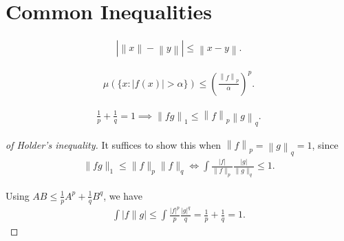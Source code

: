 \hypertarget{common-inequalities}{%
\section{Common Inequalities}\label{common-inequalities}}

\begin{proposition}

\begin{align*}  
{\left\lvert {{\left\lVert {x} \right\rVert} - {\left\lVert {y} \right\rVert}} \right\rvert} \leq {\left\lVert {x - y} \right\rVert}
.\end{align*}

\end{proposition}

\begin{proposition}

\begin{align*}  
\mu(\{x:|f(x)|>\alpha\}) \leq\left(\frac{{\left\lVert {f} \right\rVert}_{p}}{\alpha}\right)^{p}
.\end{align*}

\end{proposition}

\begin{proposition}

\begin{align*}  
\frac 1 p + \frac 1 q = 1 \implies {\left\lVert {f g} \right\rVert}_{1} \leq {\left\lVert {f} \right\rVert}_{p} {\left\lVert {g} \right\rVert}_{q}
.\end{align*}

\end{proposition}

\begin{proof}[of Holder's inequality]

It suffices to show this when
\({\left\lVert {f} \right\rVert}_p = {\left\lVert {g} \right\rVert}_q = 1\),
since
\begin{align*}  
\|f g\|_{1} \leq\|f\|_{p}\|f\|_{q} \Longleftrightarrow \int \frac{|f|}{\|f\|_{p}} \frac{|g|}{\|g\|_{q}} \leq 1
.\end{align*}

Using \(AB \leq \frac 1 p A^p + \frac 1 q B^q\), we have
\begin{align*}  
\int|f \| g| \leq \int \frac{|f|^{p}}{p} \frac{|g|^{q}}{q}=\frac{1}{p}+\frac{1}{q}=1
.\end{align*}

\end{proof}

